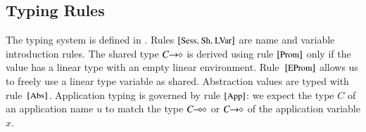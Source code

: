 

%

\subsection{Typing Rules}\label{app:typrules}

The typing system is defined in .
Rules ${\footnotesize[\textrm{\small Sess, Sh, LVar}]}$ are name and variable introduction rules. 
The shared type $C\!\! \rightarrow\!\! \diamond$ %
is derived using rule ${\footnotesize[\textrm{\small Prom}]}$ only  
if the value has a linear type with an empty linear
environment.
Rule~${\footnotesize[\textrm{\small EProm}]}$ allows us to freely use a linear
type variable as shared.
%
Abstraction values are typed with rule~${\footnotesize[\textrm{\small Abs}]}$.
Application typing
is governed by rule ${\footnotesize[\textrm{\small App}]}$: we expect
the type $C$ of an application name $u$ 
to match the type $C\!\! \multimap\!\! \diamond$ or $C\!\! \rightarrow\!\! \diamond$
of the application variable $x$.
%

